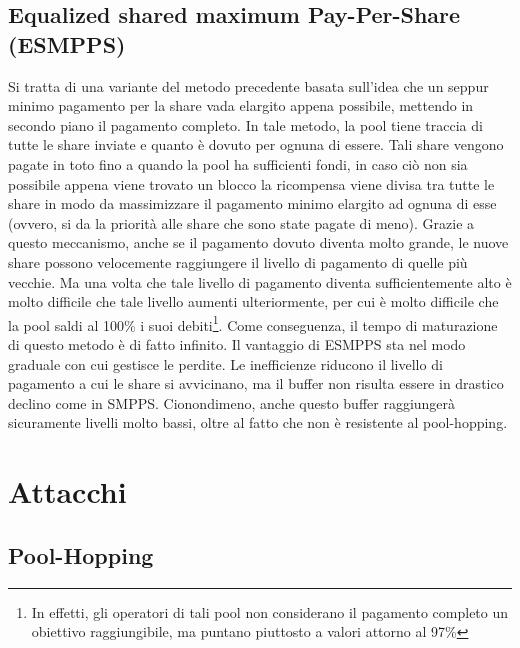 \subsection{Equalized shared maximum Pay-Per-Share (ESMPPS)}

Si tratta di una variante del metodo precedente basata sull'idea che un seppur minimo pagamento per la share vada elargito appena possibile, mettendo in secondo piano il pagamento completo.
In tale metodo, la pool tiene traccia di tutte le share inviate e quanto è dovuto per ognuna di essere. Tali share vengono pagate in toto fino a quando la pool ha sufficienti fondi, in caso ciò non sia possibile appena viene trovato un blocco la ricompensa viene divisa tra tutte le share in modo da massimizzare il pagamento minimo elargito ad ognuna di esse (ovvero, si da la priorità alle share che sono state pagate di meno).
Grazie a questo meccanismo, anche se il pagamento dovuto diventa molto grande, le nuove share possono velocemente raggiungere il livello di pagamento di quelle più vecchie. Ma una volta che tale livello di pagamento diventa sufficientemente alto è molto difficile che tale livello aumenti ulteriormente, per cui è molto difficile che la pool saldi al 100\% i suoi debiti\footnote{In effetti, gli operatori di tali pool non considerano il pagamento completo un obiettivo raggiungibile, ma puntano piuttosto a valori attorno al 97\%}. Come conseguenza, il tempo di maturazione di questo metodo è di fatto infinito.
Il vantaggio di ESMPPS sta nel modo graduale con cui gestisce le perdite. Le inefficienze riducono il livello di pagamento a cui le share si avvicinano, ma il buffer non risulta essere in drastico declino come in SMPPS. Cionondimeno, anche questo buffer raggiungerà sicuramente livelli molto bassi, oltre al fatto che non è resistente al pool-hopping.

\section{Attacchi}

\subsection{Pool-Hopping}

